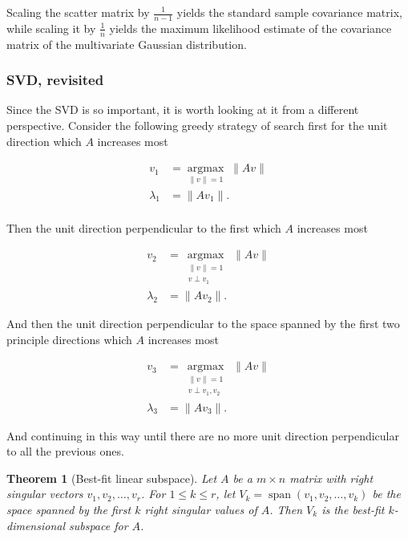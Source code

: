 \documentclass[]{article}
\newcommand{\argmax}[1]{\underset{#1}{\operatorname{argmax}}\; }
\newcommand{\spn}[1]{\operatorname{span}(#1)}
\theoremstyle{plain}
\newtheorem{thm}{Theorem}
\theoremstyle{definition}
\theoremstyle{remark}
\begin{document}
Scaling the scatter matrix by $\frac{1}{n-1}$ yields the standard sample covariance matrix,
while scaling it by $\frac{1}{n}$ yields the maximum likelihood estimate of the covariance
matrix of the multivariate Gaussian distribution.

\subsubsection{SVD, revisited}

Since the SVD is so important, it is worth looking at it from a different
perspective.  Consider the following greedy strategy of search first for
the unit direction which $A$ increases most

\begin{align*}
v_1 &= \argmax{\|v\|=1} \|A v\| \\
\lambda_1 &= \|A v_1\|. \\
\end{align*}

Then the unit direction perpendicular to the first which $A$ increases most

\begin{align*}
v_2 &= \argmax{\substack{\|v\|=1 \\ v \perp v_1}} \|A v\| \\
\lambda_2 &= \|A v_2\| .
\end{align*}

And then the unit direction perpendicular to the space spanned by the first
two principle directions which $A$ increases most

\begin{align*}
v_3 &= \argmax{\substack{\|v\|=1 \\ v \perp v_1, v_2}} \|A v\| \\
\lambda_3 &= \|A v_3\| .
\end{align*}

And continuing in this way until there are no more unit direction perpendicular
to all the previous ones.

\begin{thm}[Best-fit linear subspace]
Let $A$ be a $m \times n$ matrix with right singular vectors $v_1, v_2, \dots, v_r$.
For $1\le k \le r$, let $V_k=\spn{v_1, v_2, \dots, v_k}$ be the space spanned
by the first $k$ right singular values of $A$.  Then $V_k$ is the best-fit
$k$-dimensional subspace for $A$.
\end{thm}
\end{document}
